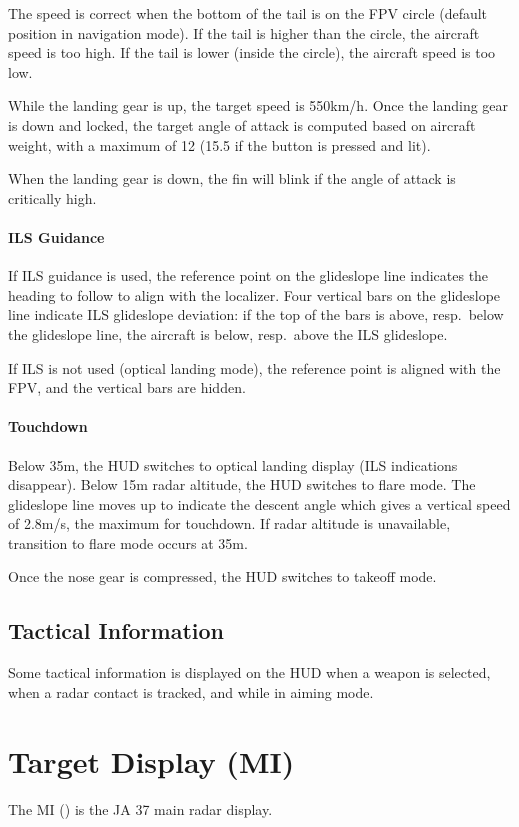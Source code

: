 The speed is correct when the bottom of the tail is on the FPV circle
(default position in navigation mode).
If the tail is higher than the circle, the aircraft speed is too high.
If the tail is lower (inside the circle), the aircraft speed is too low.

While the landing gear is up, the target speed is 550km/h.
Once the landing gear is down and locked, the target angle of attack is
computed based on aircraft weight, with a maximum of 12\textdegree{}
(15.5\textdegree{} if the button  is pressed and lit).

When the landing gear is down, the fin will blink if the angle of attack is critically high.

\paragraph{ILS Guidance}
If ILS guidance is used, the reference point on the glideslope line
indicates the heading to follow to align with the localizer.
Four vertical bars on the glideslope line indicate ILS glideslope deviation:
if the top of the bars is above, resp.\ below the glideslope line,
the aircraft is below, resp.\ above the ILS glideslope.

If ILS is not used (optical landing mode),
the reference point is aligned with the FPV, and the vertical bars are hidden.

\paragraph{Touchdown}
Below 35m, the HUD switches to optical landing display (ILS indications disappear).
Below 15m radar altitude, the HUD switches to flare mode.
The glideslope line moves up to indicate the descent angle
which gives a vertical speed of 2.8m/s, the maximum for touchdown.
If radar altitude is unavailable, transition to flare mode occurs at 35m.

Once the nose gear is compressed, the HUD switches to takeoff mode.

\subsection{Tactical Information}
Some tactical information is displayed on the HUD when a weapon is selected,
when a radar contact is tracked, and while in aiming mode.


\section{Target Display (MI)}
The MI () is the JA 37 main radar display.

